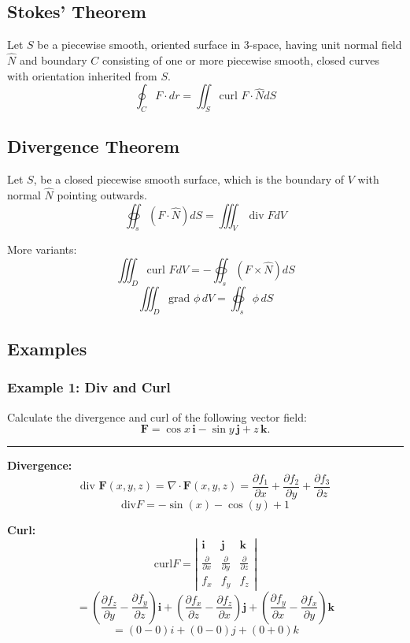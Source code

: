 \subsection{Stokes' Theorem}
Let $S$ be a piecewise smooth, oriented surface in 3-space, having unit normal field $\widehat{N}$ and boundary $C$ consisting of one or more piecewise smooth, closed curves with orientation inherited from $S$.
$$\oint_{C}F\cdot dr=\iint_{S}\text{curl }F\cdot\widehat{N}dS$$

\subsection{Divergence Theorem}
Let $S$, be a closed piecewise smooth surface, which is the boundary of $V$ with normal $\widehat{N}$ pointing outwards.
$$\oiint_{s}(F \cdot \widehat{N}) d S=\iiint_V \operatorname{div} F d V$$

More variants:
$$\iiint_{D}\text{curl }FdV=-\oiint_{s}(F \times\widehat{N})dS$$
$$\iiint_{D}\text{grad }\phi \,dV=\oiint_{s}\phi \,dS$$

\subsection{Examples}
\subsubsection{Example 1: Div and Curl}
Calculate the divergence and curl of the following vector field:
$$\mathbf{F}=\cos x\,\mathbf{i}-\sin y\,\mathbf{j}+z\,\mathbf{k}.$$

\rule{\textwidth}{1pt}

\textbf{Divergence:}
$$\text{div }\mathbf{F}(x,y,z)=\nabla \cdot \mathbf{F}(x,y,z)=\frac{ \partial f_{1} }{ \partial x } +\frac{ \partial f_{2} }{ \partial y } +\frac{ \partial f_{3} }{ \partial z } $$
$$\text{div}F=-\sin(x)-\cos(y)+1$$

\textbf{Curl:}
$$\text{curl}F=\left|\begin{array}{ccc}\mathbf{i} & \mathbf{j} & \mathbf{k} \\ \frac{ \partial  }{ \partial x } & \frac{ \partial  }{ \partial y } & \frac{ \partial  }{ \partial z } \\ f_{x} & f_{y} & f_{z} \end{array}\right|$$
$$=\left(\frac{ \partial f_{z} }{ \partial y } -\frac{ \partial f_{y} }{ \partial z } \right)\mathbf{i}+\left(\frac{ \partial f_{x} }{ \partial z } -\frac{ \partial f_{z} }{ \partial x } \right)\mathbf{j}+\left(\frac{ \partial f_{y} }{ \partial x } -\frac{ \partial f_{x} }{ \partial y } \right)\mathbf{k}$$
$$=(0-0)i+(0-0)j+(0+0)k$$
